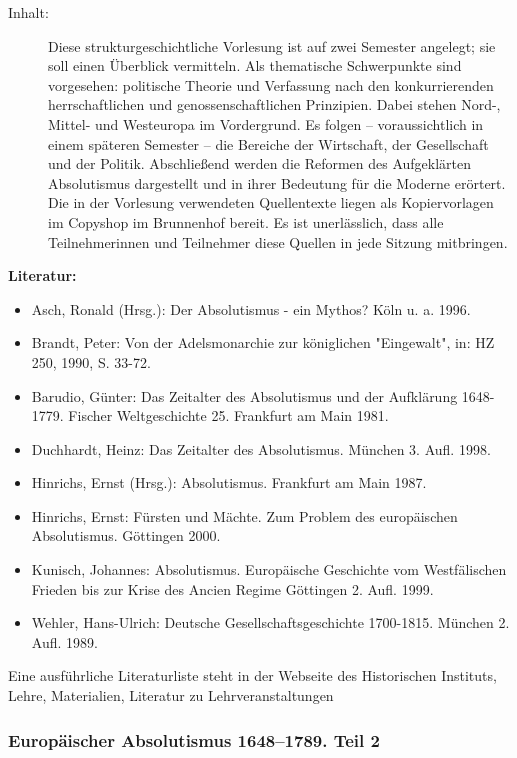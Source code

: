 \documentclass[%
a4paper, %
11pt,               %
leqno,              %
fleqn,              %
]
{scrartcl}
\begin{document}
\begin{description}
  \item[Inhalt:] Diese strukturgeschichtliche Vorlesung ist auf zwei Semester
    angelegt; sie soll einen Überblick vermitteln. Als thematische Schwerpunkte
    sind vorgesehen: politische Theorie und Verfassung nach den konkurrierenden
    herrschaftlichen und genossenschaftlichen Prinzipien. Dabei stehen Nord-,
    Mittel- und Westeuropa im Vordergrund. Es folgen -- voraussichtlich in einem
    späteren Semester -- die Bereiche der Wirtschaft, der Gesellschaft und der
    Politik. Abschließend werden die Reformen des Aufgeklärten Absolutismus
    dargestellt und in ihrer Bedeutung für die Moderne erörtert. Die in der
    Vorlesung verwendeten Quellentexte liegen als Kopiervorlagen im Copyshop im
    Brunnenhof bereit. Es ist unerlässlich, dass alle Teilnehmerinnen und
    Teilnehmer diese Quellen in jede Sitzung mitbringen.
\end{description}
\textsf{\textbf{Literatur:}}
\begin{itemize}\itemsep0pt
  \item Asch, Ronald (Hrsg.): Der Absolutismus - ein Mythos? Köln u. a. 1996.
  \item Brandt, Peter: Von der Adelsmonarchie zur königlichen "Eingewalt", in: HZ 250, 1990, S. 33-72.
  \item Barudio, Günter: Das Zeitalter des Absolutismus und der Aufklärung
    1648-1779. Fischer Weltgeschichte 25. Frankfurt am Main 1981.
  \item Duchhardt, Heinz: Das Zeitalter des Absolutismus. München 3. Aufl. 1998.
  \item Hinrichs, Ernst (Hrsg.): Absolutismus. Frankfurt am Main 1987.
  \item Hinrichs, Ernst: Fürsten und Mächte. Zum Problem des europäischen Absolutismus. Göttingen 2000.
  \item Kunisch, Johannes: Absolutismus. Europäische Geschichte vom
    Westfälischen Frieden bis zur Krise des Ancien Regime Göttingen 2. Aufl.
    1999.
  \item Wehler, Hans-Ulrich: Deutsche Gesellschaftsgeschichte 1700-1815. München 2.  Aufl. 1989.
\end{itemize}
Eine ausführliche Literaturliste steht in der Webseite des Historischen
Instituts, Lehre, Materialien, Literatur zu Lehrveranstaltungen


\subsubsection{Europäischer Absolutismus 1648--1789. Teil 2} %
\label{ssub:Europäischer Absolutismus 1648--1789. Teil 2}
\end{document}

